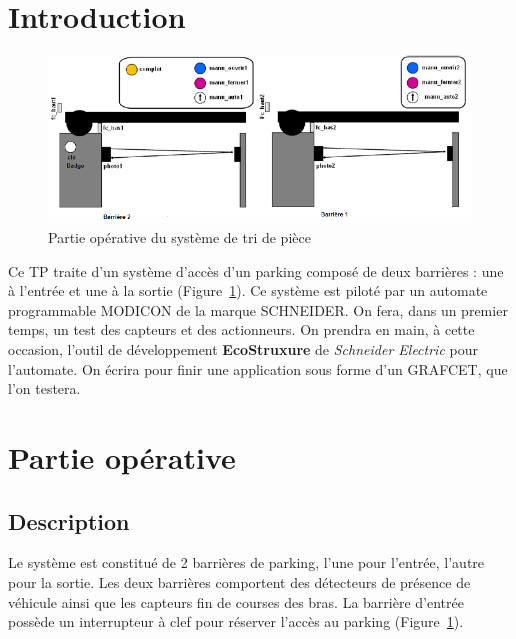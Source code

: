 \documentclass[11pt, multicol]{article}
\begin{document}
\UPSTIbuildPage
{}

\tableofcontents


\section{Introduction}
\begin{figure}[ht]
	\centering
	\includegraphics[width=.8\linewidth]{images/schemaSysteme}
	\caption{Partie opérative du système de tri de pièce}
	\label{fig:schemaPartieOperative}
\end{figure}
Ce TP traite d'un système d'accès d'un parking composé de deux barrières : une à l'entrée et une à la sortie (Figure~\ref{fig:schemaPartieOperative}). Ce système est piloté par un automate programmable MODICON de la marque SCHNEIDER. On fera, dans un premier temps, un test des capteurs et des actionneurs.
On prendra en main, à cette occasion, l’outil de développement \textbf{EcoStruxure} de \textit{Schneider Electric} pour l’automate. On écrira pour finir une application sous forme d’un GRAFCET, que l’on testera.

\section{Partie opérative}
\subsection{Description}
Le système est constitué de 2 barrières de parking, l’une pour l’entrée, l’autre pour la sortie. Les deux barrières comportent des détecteurs de présence de véhicule ainsi que les capteurs fin de courses des bras. La barrière d'entrée possède un interrupteur à clef pour réserver l'accès au parking (Figure~\ref{fig:schemaPartieOperative}).
\end{document}
